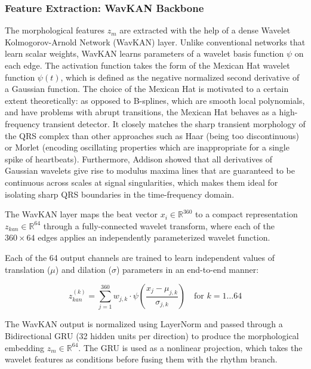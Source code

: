\documentclass[pdflatex,sn-mathphys-num]{sn-jnl}
\theoremstyle{thmstyleone}
\theoremstyle{thmstyletwo}
\theoremstyle{thmstylethree}
\begin{document}
\subsubsection{Feature Extraction: WavKAN Backbone}
The morphological features $z_m$ are extracted with the help of a dense Wavelet Kolmogorov-Arnold Network (WavKAN) layer. Unlike conventional networks that learn scalar weights, WavKAN learns parameters of a wavelet basis function $\psi$ on each edge. The activation function takes the form of the Mexican Hat wavelet function $\psi(t)$, which is defined as the negative normalized second derivative of a Gaussian function. The choice of the Mexican Hat is motivated to a certain extent theoretically: as opposed to B-splines, which are smooth local polynomials, and have problems with abrupt transitions, the Mexican Hat behaves as a high-frequency transient detector. It closely matches the sharp transient morphology of the QRS complex than other approaches such as Haar (being too discontinuous) or Morlet (encoding oscillating properties which are inappropriate for a single spike of heartbeats). Furthermore, Addison \cite{addison_wavelet_2005} showed that all derivatives of Gaussian wavelets give rise to modulus maxima lines that are guaranteed to be continuous across scales at signal singularities, which makes them ideal for isolating sharp QRS boundaries in the time-frequency domain.

The WavKAN layer maps the beat vector $x_i \in \mathbb{R}^{360}$ to a compact representation $z_{kan} \in \mathbb{R}^{64}$ through a fully-connected wavelet transform, where each of the $360 \times 64$ edges applies an independently parameterized wavelet function.

Each of the 64 output channels are trained to learn independent values of translation ($\mu$) and dilation ($\sigma$) parameters in an end-to-end manner:

\begin{equation}
z_{kan}^{(k)} = \sum_{j=1}^{360} w_{j,k} \cdot \psi\left(\frac{x_j - \mu_{j,k}}{\sigma_{j,k}}\right) \quad \text{for } k=1 \dots 64
\end{equation}

The WavKAN output is normalized using LayerNorm and passed through a Bidirectional GRU (32 hidden units per direction) \cite{zhao_mak-net_2025, mousavi_inter-_2019} to produce the morphological embedding $z_m \in \mathbb{R}^{64}$. The GRU is used as a nonlinear projection, which takes the wavelet features as conditions before fusing them with the rhythm branch.
\end{document}
